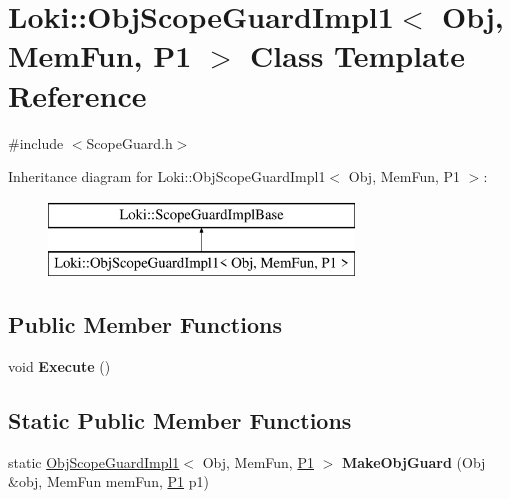 \hypertarget{classLoki_1_1ObjScopeGuardImpl1}{}\section{Loki\+:\+:Obj\+Scope\+Guard\+Impl1$<$ Obj, Mem\+Fun, P1 $>$ Class Template Reference}
\label{classLoki_1_1ObjScopeGuardImpl1}


{\ttfamily \#include $<$Scope\+Guard.\+h$>$}

Inheritance diagram for Loki\+:\+:Obj\+Scope\+Guard\+Impl1$<$ Obj, Mem\+Fun, P1 $>$\+:\begin{figure}[H]
\begin{center}
\leavevmode
\includegraphics[height=2.000000cm]{classLoki_1_1ObjScopeGuardImpl1}
\end{center}
\end{figure}
\subsection*{Public Member Functions}
\begin{DoxyCompactItemize}
\item 
\hypertarget{classLoki_1_1ObjScopeGuardImpl1_a36cb828d2580abc7a30819e23a119231}{}void {\bfseries Execute} ()\label{classLoki_1_1ObjScopeGuardImpl1_a36cb828d2580abc7a30819e23a119231}

\end{DoxyCompactItemize}
\subsection*{Static Public Member Functions}
\begin{DoxyCompactItemize}
\item 
\hypertarget{classLoki_1_1ObjScopeGuardImpl1_a06c916ff726060574a5990dadf1f8ccc}{}static \hyperlink{classLoki_1_1ObjScopeGuardImpl1}{Obj\+Scope\+Guard\+Impl1}$<$ Obj, Mem\+Fun, \hyperlink{structP1}{P1} $>$ {\bfseries Make\+Obj\+Guard} (Obj \&obj, Mem\+Fun mem\+Fun, \hyperlink{structP1}{P1} p1)\label{classLoki_1_1ObjScopeGuardImpl1_a06c916ff726060574a5990dadf1f8ccc}

\end{DoxyCompactItemize}
